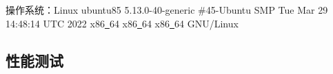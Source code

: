 \documentclass[supercite]{HustGraduPaper}
\theoremstyle{definition}
\begin{document}
操作系统：Linux ubuntu85 5.13.0-40-generic \#45-Ubuntu SMP Tue Mar 29 14:48:14 UTC 2022 x86\underline{~}64 x86\underline{~}64 x86\underline{~}64 GNU/Linux\par

%
%
%
%
%
%
%
%
%

\subsection{性能测试}
\end{document}

